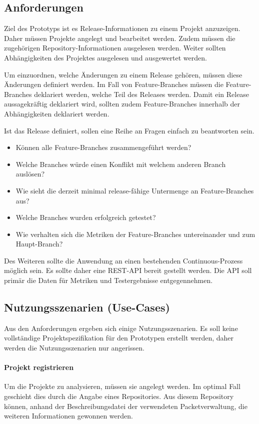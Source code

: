 \subsection{Anforderungen}

Ziel des Prototyps ist es Release-Informationen zu einem Projekt anzuzeigen. Daher müssen Projekte angelegt und bearbeitet werden. Zudem müssen die zugehörigen Repository-Informationen ausgelesen werden. Weiter sollten Abhängigkeiten des Projektes ausgelesen und ausgewertet werden. 

Um einzuordnen, welche Änderungen zu einem Release gehören, müssen diese Änderungen definiert werden. Im Fall von Feature-Branches müssen die Feature-Branches deklariert werden, welche Teil des Releases werden. Damit ein Release aussagekräftig deklariert wird, sollten zudem Feature-Branches innerhalb der Abhängigkeiten deklariert werden.

Ist das Release definiert, sollen eine Reihe an Fragen einfach zu beantworten sein. 
\begin{itemize}
\item Können alle Feature-Branches zusammengeführt werden?
\item Welche Branches würde einen Konflikt mit welchem anderen Branch auslösen?
\item Wie sieht die derzeit minimal release-fähige Untermenge an Feature-Branches aus?
\item Welche Branches wurden erfolgreich getestet?
\item Wie verhalten sich die Metriken der Feature-Branches untereinander und zum Haupt-Branch?
\end{itemize}

Des Weiteren sollte die Anwendung an einen bestehenden Continuous-Prozess möglich sein. Es sollte daher eine REST-API bereit gestellt werden. Die API soll primär die Daten für Metriken und Testergebnisse entgegennehmen.

\subsection{Nutzungsszenarien (Use-Cases)}

Aus den Anforderungen ergeben sich einige Nutzungsszenarien. Es soll keine vollständige Projektspezifikation für den Prototypen erstellt werden, daher werden die Nutzungsszenarien nur angerissen. 

\paragraph{Projekt registrieren}
Um die Projekte zu analysieren, müssen sie angelegt werden. Im optimal Fall geschieht dies durch die Angabe eines Repositories. Aus diesem Repository können, anhand der Beschreibungsdatei der verwendeten Packetverwaltung, die weiteren Informationen gewonnen werden.


